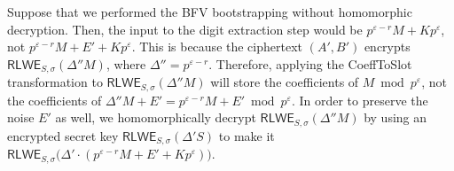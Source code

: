  Suppose that we performed the BFV bootstrapping without homomorphic decryption. Then, the input to the digit extraction step would be $p^{\varepsilon-r}M + Kp^\varepsilon$, not $p^{\varepsilon-r}M + E' + Kp^\varepsilon$. This is because the ciphertext $(A', B')$ encrypts $\textsf{RLWE}_{S,\sigma}(\Delta'' M)$, where $\Delta'' = p^{\varepsilon-r}$. Therefore, applying the \textsf{CoeffToSlot} transformation to $\textsf{RLWE}_{S,\sigma}(\Delta'' M)$ will store the coefficients of $M \bmod p^\varepsilon$, not the coefficients of $\Delta'' M + E' = p^{\varepsilon-r}M + E' \bmod p^\varepsilon$. In order to preserve the noise $E'$ as well, we homomorphically decrypt $\textsf{RLWE}_{S,\sigma}(\Delta'' M)$ by using an encrypted secret key $\textsf{RLWE}_{S, \sigma}(\Delta' S)$ to make it $\textsf{RLWE}_{S,\sigma}\bm(\Delta' \cdot (p^{\varepsilon-r}M + E' + Kp^\varepsilon) \bm)$. 
